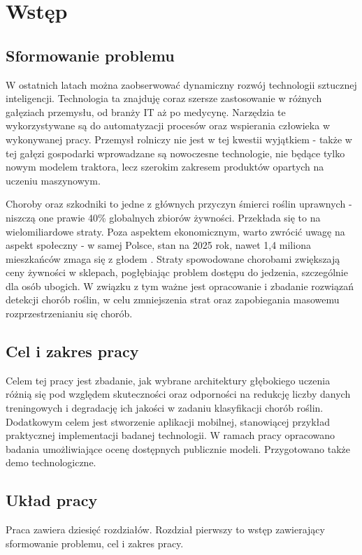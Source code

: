 \newpage %
\section{Wstęp}
\subsection{Sformowanie problemu}
  W ostatnich latach można zaobserwować dynamiczny rozwój technologii sztucznej inteligencji. Technologia ta znajduję coraz szersze zastosowanie w  różnych gałęziach przemysłu, od branży IT aż po medycynę. Narzędzia te wykorzystywane są do automatyzacji procesów oraz wspierania człowieka w wykonywanej pracy. Przemysł rolniczy nie jest w tej kwestii wyjątkiem - także w tej gałęzi gospodarki wprowadzane są nowoczesne technologie, nie będące tylko nowym modelem traktora, lecz szerokim zakresem produktów opartych na uczeniu maszynowym. 
  
  Choroby oraz szkodniki to jedne z głównych przyczyn śmierci roślin uprawnych - niszczą one prawie 40\% globalnych zbiorów żywności\cite{FAO2025PlantDiseasesFoodSecurity}. Przekłada się to na wielomiliardowe straty. Poza aspektem ekonomicznym, warto zwrócić uwagę na aspekt społeczny - w samej Polsce, stan na 2025 rok, nawet 1,4 miliona mieszkańców zmaga się z głodem \cite{PCK2025Glod}. Straty spowodowane chorobami zwiększają ceny żywności w sklepach, pogłębiając problem dostępu do jedzenia, szczególnie dla osób ubogich. W związku z tym ważne jest opracowanie i zbadanie rozwiązań detekcji chorób roślin, w celu zmniejszenia strat oraz zapobiegania masowemu rozprzestrzenianiu się chorób.
\subsection{Cel i zakres pracy}
Celem tej pracy jest zbadanie, jak wybrane architektury głębokiego uczenia różnią się pod względem skuteczności oraz odporności na redukcję liczby danych treningowych i degradację ich jakości w zadaniu klasyfikacji chorób roślin. Dodatkowym celem jest stworzenie aplikacji mobilnej, stanowiącej przykład praktycznej implementacji badanej technologii. W ramach pracy  opracowano badania umożliwiające ocenę dostępnych publicznie modeli. Przygotowano także demo technologiczne.
\subsection{Układ pracy} 
Praca zawiera dziesięć rozdziałów. Rozdział pierwszy to wstęp zawierający sformowanie problemu, cel i zakres pracy.

